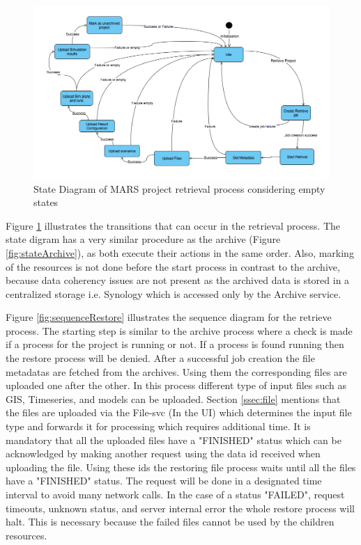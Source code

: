     \begin{figure}[H]
        \centering \includegraphics[scale=0.45]{grafiken/stateRestore.png}
        \caption{State Diagram of MARS project retrieval process considering empty states}
        \label{fig:stateRestore}
    \end{figure}

    Figure \ref{fig:stateRestore} illustrates the transitions that can occur in the retrieval process. The state digram has a very similar procedure as the
    archive (Figure \ref{fig:stateArchive}), as both execute their actions in the same order. 
    Also, marking of the resources is not done before the start process in contrast to the archive, because data coherency issues are not present as the archived
    data is stored in a centralized storage i.e. Synology which is accessed only by the Archive service.   

Figure \ref{fig:sequenceRestore} illustrates the sequence diagram for the retrieve process. The starting step is similar to the archive process where a
check is made if a process for the project is running or not. If a process is found running then the restore process will be denied. After a
successful job creation the file metadatas are fetched from the archives. Using them the corresponding files are uploaded one after the other. 
In this process different type of input files such as GIS, Timeseries, and models can be uploaded. Section \ref{ssec:file} mentions that the files are uploaded via
the File-svc (In the UI) which determines the input file type and forwards it for processing which requires additional time.
It is mandatory
that all the uploaded files have a "FINISHED" status which can be acknowledged by making another request using the data id received when uploading the file. 
Using these ids the restoring file process waits until all the files have a "FINISHED" status. The request will be done in a designated time interval to avoid many
network calls. In the case of a status "FAILED", request timeouts, unknown status, and server internal error the whole restore process will halt. 
This is necessary because the failed files cannot be used by the children resources.

